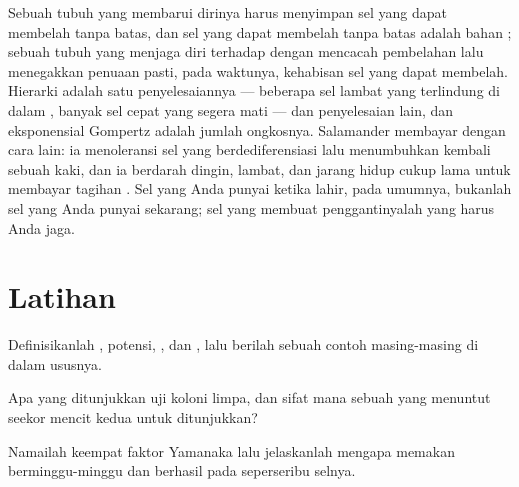 \begin{remark}\label{rem:b3:stem-cells:remark}
Sebuah tubuh yang membarui dirinya harus menyimpan sel yang dapat membelah
tanpa batas, dan sel yang dapat membelah tanpa batas adalah bahan
; sebuah tubuh yang menjaga diri terhadap  dengan mencacah pembelahan lalu
menegakkan penuaan pasti, pada waktunya, kehabisan sel yang dapat membelah.
Hierarki  adalah satu penyelesaiannya --- beberapa sel lambat yang terlindung di dalam
, banyak sel cepat yang segera mati --- dan  penyelesaian lain,
dan eksponensial Gompertz adalah jumlah ongkosnya. Salamander
membayar dengan cara lain: ia menoleransi sel yang berdediferensiasi
lalu menumbuhkan kembali sebuah kaki, dan ia berdarah dingin, lambat, dan jarang hidup cukup lama
untuk membayar tagihan . Sel yang Anda punyai ketika lahir, pada
umumnya, bukanlah sel yang Anda punyai sekarang; sel yang membuat
penggantinyalah yang harus Anda jaga.
\end{remark}

\section{Latihan}

\begin{exercise}[$\star$]\label{exo:b3:stem-cells:1}
Definisikanlah , potensi, , dan , lalu
berilah sebuah contoh masing-masing di dalam ususnya.
\end{exercise}

\begin{exercise}[$\star$]\label{exo:b3:stem-cells:2}
Apa yang ditunjukkan uji koloni limpa, dan sifat mana sebuah  yang
menuntut seekor mencit kedua untuk ditunjukkan?
\end{exercise}

\begin{exercise}[$\star$]\label{exo:b3:stem-cells:3}
Namailah keempat faktor Yamanaka lalu jelaskanlah mengapa  memakan
berminggu-minggu dan berhasil pada seperseribu selnya.
\end{exercise}


